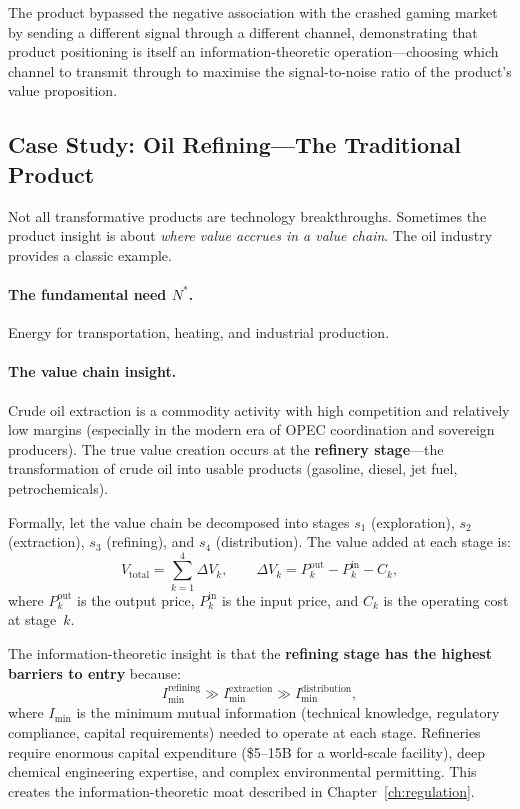 \documentclass[12pt,a4paper,oneside]{book}
\theoremstyle{definition}
\theoremstyle{remark}
\begin{document}
The product bypassed the negative association with the crashed gaming market by
sending a different signal through a different channel, demonstrating that product
positioning is itself an information-theoretic operation---choosing which channel to
transmit through to maximise the signal-to-noise ratio of the product's value
proposition.

\subsection{Case Study: Oil Refining---The Traditional Product}

Not all transformative products are technology breakthroughs. Sometimes the product
insight is about \emph{where value accrues in a value chain}. The oil industry provides
a classic example.

\paragraph{The fundamental need $N^*$.} Energy for transportation, heating, and
industrial production.

\paragraph{The value chain insight.} Crude oil extraction is a commodity activity with
high competition and relatively low margins (especially in the modern era of OPEC
coordination and sovereign producers). The true value creation occurs at the
\textbf{refinery stage}---the transformation of crude oil into usable products
(gasoline, diesel, jet fuel, petrochemicals).

Formally, let the value chain be decomposed into stages $s_1$ (exploration),
$s_2$ (extraction), $s_3$ (refining), and $s_4$ (distribution). The value added at
each stage is:
\begin{equation}\label{eq:value_chain}
  V_{\text{total}} = \sum_{k=1}^4 \Delta V_k,
  \qquad
  \Delta V_k = P_k^{\text{out}} - P_k^{\text{in}} - C_k,
\end{equation}
where $P_k^{\text{out}}$ is the output price, $P_k^{\text{in}}$ is the input price,
and $C_k$ is the operating cost at stage~$k$.

The information-theoretic insight is that the \textbf{refining stage has the highest
barriers to entry} because:
\begin{equation}
  I_{\min}^{\text{refining}} \gg I_{\min}^{\text{extraction}}
  \gg I_{\min}^{\text{distribution}},
\end{equation}
where $I_{\min}$ is the minimum mutual information (technical knowledge, regulatory
compliance, capital requirements) needed to operate at each stage. Refineries require
enormous capital expenditure (\$5--15B for a world-scale facility), deep chemical
engineering expertise, and complex environmental permitting. This creates the
information-theoretic moat described in Chapter~\ref{ch:regulation}.
\end{document}
